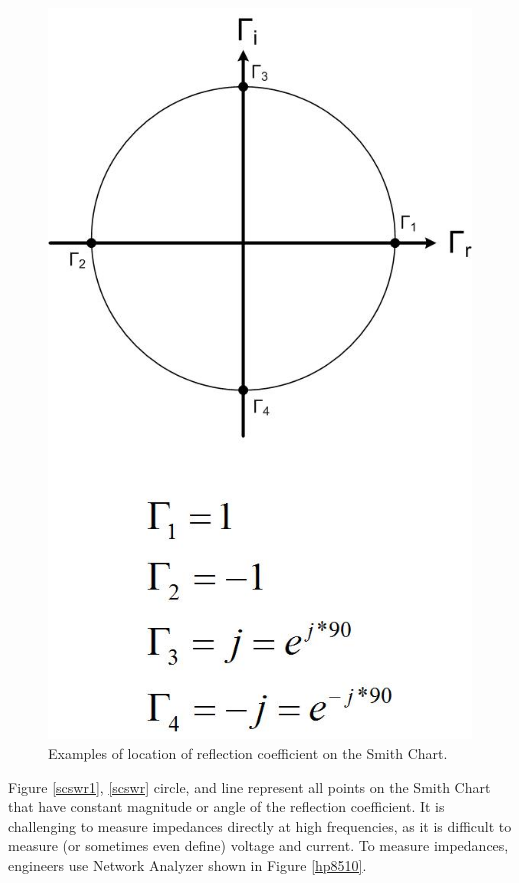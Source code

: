 \documentclass{ximera}
\begin{document}
\begin{figure}[htbp]
\begin{center}
\includegraphics[scale=0.3]{../jpg/Smith_Chart_Reflection_Coefficient.jpg}
\end{center}
\caption{Examples of location of reflection coefficient on the Smith Chart.}
\label{scex}
\end{figure}


Figure \ref{scswr1}, \ref{scswr}  circle, and line represent all points on the Smith Chart that have constant magnitude or angle of the reflection coefficient. It is challenging to measure impedances directly at high frequencies, as it is difficult to measure (or sometimes even define) voltage and current. 
To measure impedances, engineers use Network Analyzer shown in Figure \ref{hp8510}.
\end{document}
